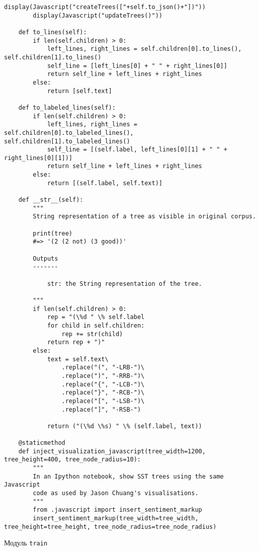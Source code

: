 \begin{lstlisting}[style=app]
        display(Javascript("createTrees(["+self.to_json()+"])"))
        display(Javascript("updateTrees()"))

    def to_lines(self):
        if len(self.children) > 0:
            left_lines, right_lines = self.children[0].to_lines(), self.children[1].to_lines()
            self_line = [left_lines[0] + " " + right_lines[0]]
            return self_line + left_lines + right_lines
        else:
            return [self.text]

    def to_labeled_lines(self):
        if len(self.children) > 0:
            left_lines, right_lines = self.children[0].to_labeled_lines(), self.children[1].to_labeled_lines()
            self_line = [(self.label, left_lines[0][1] + " " + right_lines[0][1])]
            return self_line + left_lines + right_lines
        else:
            return [(self.label, self.text)]

    def __str__(self):
        """
        String representation of a tree as visible in original corpus.

        print(tree)
        #=> '(2 (2 not) (3 good))'

        Outputs
        -------

            str: the String representation of the tree.

        """
        if len(self.children) > 0:
            rep = "(\%d " \% self.label
            for child in self.children:
                rep += str(child)
            return rep + ")"
        else:
            text = self.text\
                .replace("(", "-LRB-")\
                .replace(")", "-RRB-")\
                .replace("{", "-LCB-")\
                .replace("}", "-RCB-")\
                .replace("[", "-LSB-")\
                .replace("]", "-RSB-")

            return ("(\%d \%s) " \% (self.label, text))

    @staticmethod
    def inject_visualization_javascript(tree_width=1200, tree_height=400, tree_node_radius=10):
        """
        In an Ipython notebook, show SST trees using the same Javascript
        code as used by Jason Chuang's visualisations.
        """
        from .javascript import insert_sentiment_markup
        insert_sentiment_markup(tree_width=tree_width, tree_height=tree_height, tree_node_radius=tree_node_radius)
\end{lstlisting}

\begin{center}Модуль \texttt{train}\end{center}

